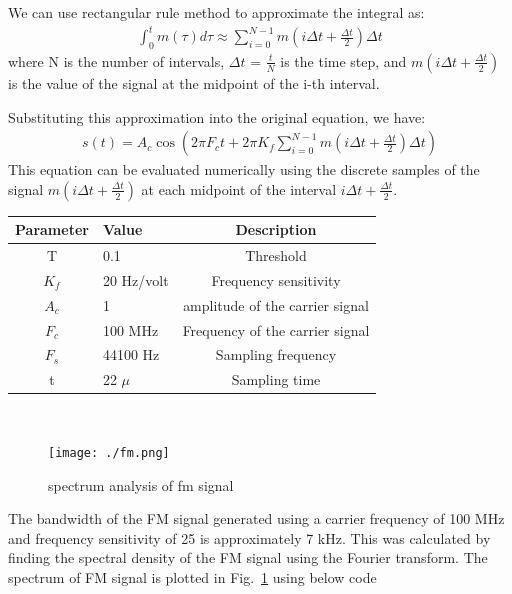 \documentclass[journal,5pt,twocolumn]{IEEEtran}
\newcommand\figref{Fig.~\ref}
\begin{document}
\begin{enumerate}
 \fi
 
We can use rectangular rule method to approximate the integral as:
\begin{align}
\int_{0}^t m(\tau) d\tau \approx \sum_{i=0}^{N-1} m\left(i \Delta t + \frac{\Delta t}{2}\right) \Delta t
\end{align}
where N is the number of intervals, $\Delta t$ = $\frac{t}{N}$ is the time step, and $m\left(i \Delta t + \frac{\Delta t}{2}\right)$ is the value of the signal at the midpoint of the i-th interval.

Substituting this approximation into the original equation, we have:
\begin{align}
s(t) = A_c \cos \left(2 \pi F_c t +2\pi K_{f} \sum_{i=0}^{N-1} m\left(i \Delta t + \frac{\Delta t}{2}\right) \Delta t\right)
\end{align}
This equation can be evaluated numerically using the discrete samples of the signal $m\left(i \Delta t + \frac{\Delta t}{2}\right)$ at each midpoint of the interval $i\Delta t + \frac{\Delta t}{2}. $
 
 
 
 
    \begin{tabular}{|c|l|c|}
    \hline 
    \textbf{Parameter} & \textbf{Value} &\textbf{Description} \\ \hline
    T&0.1&Threshold\\
    $K_{f}$ & 20 Hz/volt & Frequency sensitivity \\ 
    $A_c$ & 1  & amplitude of the carrier signal\\ 
    $F_c $& 100 MHz & Frequency of the carrier signal\\ 
    $F_s$ & 44100 Hz & Sampling frequency\\ 
    t     & 22 $\mu$ & Sampling time\\  \hline
    \end{tabular}
    \\
       

 \begin{figure}
\centering 
\texttt{[image: ./fm.png]}
\caption{spectrum analysis of fm signal}
\label{fig:fm_spectrum}
\end{figure}

 The bandwidth of the FM signal generated using a carrier frequency of 100 MHz and frequency sensitivity of 25  is approximately 7 kHz. This was calculated by finding the spectral density of the FM signal using the Fourier transform.
The spectrum of FM signal is plotted in \figref{fig:fm_spectrum} using below code
\begin{center}
\end{center}

\end{enumerate}
\end{document}
